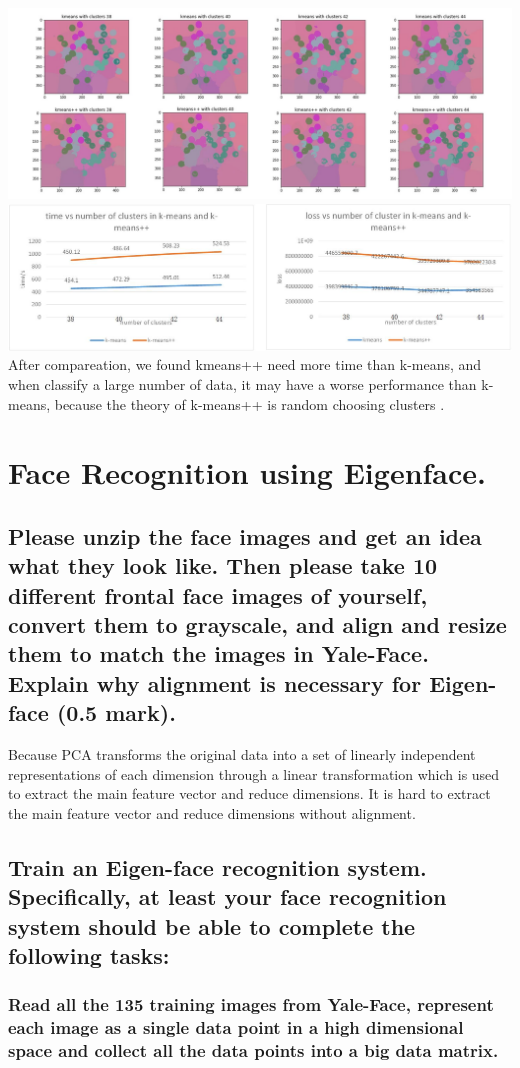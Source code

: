 \documentclass[]{article}
\begin{document}
\includegraphics[width=15cm]{kmeansvsplus.jpg}
\includegraphics[width=15cm]{timeloss.jpg}
After compareation, we found kmeans++ need more time than k-means, and when classify a large number of data, it may have a worse performance than k-means, because the theory of k-means++ is random choosing clusters .

\section{Face Recognition using Eigenface.}
\subsection{Please unzip the face images and get an idea what they look like. Then please take 10 different frontal face images of yourself, convert them to grayscale, and align and resize them to match the images in Yale-Face. Explain why alignment is necessary for Eigen-face (0.5 mark).}
Because PCA transforms the original data into a set of linearly independent representations of each dimension through a linear transformation which is used to extract the main feature vector and reduce dimensions. It is hard to extract the main feature vector and reduce dimensions without alignment.

\subsection{Train an Eigen-face recognition system. Specifically, at least your face recognition system should be able to complete the following tasks:}
\subsubsection{Read all the 135 training images from Yale-Face, represent each image as a single data point in a high dimensional space and collect all the data points into a big data matrix.}
\end{document}
